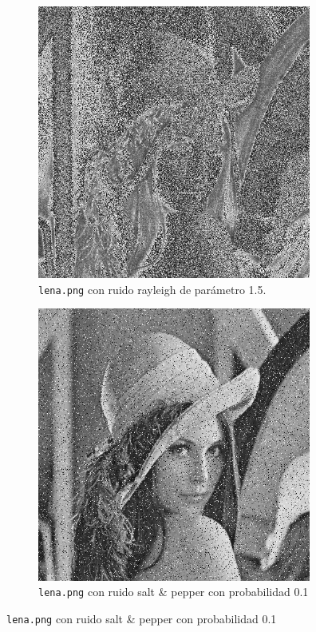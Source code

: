 \documentclass[11pt, spanish]{article}
\begin{document}
\begin{figure}[H]
\centering
\begin{subfigure}{0.5\linewidth}
\centering
  \includegraphics[height=9cm]{ej1-imgs/lena-rayleigh15.png}
  \caption{\footnotesize{\texttt{lena.png} con ruido rayleigh de parámetro 1.5.}}
\end{subfigure}%
\begin{subfigure}{0.5\linewidth}
\centering
  \includegraphics[height=9cm]{ej1-imgs/lena-saltpepper10.png}
  \caption{\footnotesize{\texttt{lena.png} con ruido salt \& pepper con probabilidad 0.1}}
\end{subfigure}
\end{figure}
\end{document}
